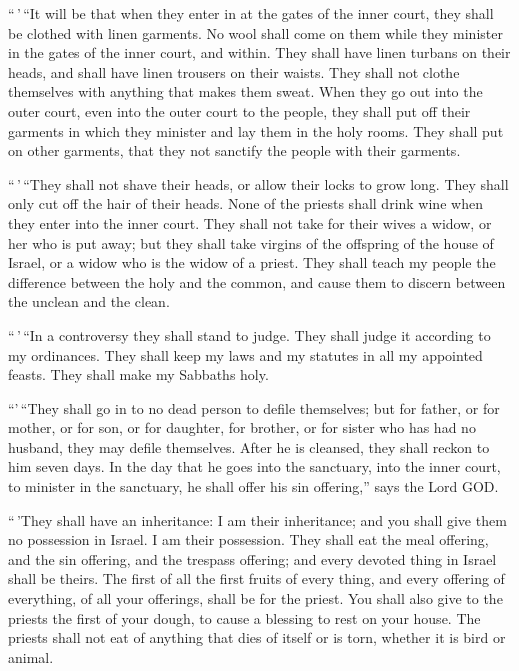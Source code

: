  ``\,'\,``It will be that when they enter in at the gates
of the inner court, they shall be clothed with linen garments. No wool
shall come on them while they minister in the gates of the inner court,
and within.  They shall have linen turbans on their heads,
and shall have linen trousers on their waists. They shall not clothe
themselves with anything that makes them sweat.  When they
go out into the outer court, even into the outer court to the people,
they shall put off their garments in which they minister and lay them in
the holy rooms. They shall put on other garments, that they not sanctify
the people with their garments.

 ``\,'\,``They shall not shave their heads, or allow their
locks to grow long. They shall only cut off the hair of their heads.
 None of the priests shall drink wine when they enter into
the inner court.  They shall not take for their wives a
widow, or her who is put away; but they shall take virgins of the
offspring of the house of Israel, or a widow who is the widow of a
priest.  They shall teach my people the difference between
the holy and the common, and cause them to discern between the unclean
and the clean.

 ``\,'\,``In a controversy they shall stand to judge. They
shall judge it according to my ordinances. They shall keep my laws and
my statutes in all my appointed feasts. They shall make my Sabbaths
holy.

 ``'\,``They shall go in to no dead person to defile
themselves; but for father, or for mother, or for son, or for daughter,
for brother, or for sister who has had no husband, they may defile
themselves.  After he is cleansed, they shall reckon to him
seven days.  In the day that he goes into the sanctuary,
into the inner court, to minister in the sanctuary, he shall offer his
sin offering,'' says the Lord GOD.

 ``\,'They shall have an inheritance: I am their
inheritance; and you shall give them no possession in Israel. I am their
possession.  They shall eat the meal offering, and the sin
offering, and the trespass offering; and every devoted thing in Israel
shall be theirs.  The first of all the first fruits of
every thing, and every offering of everything, of all your offerings,
shall be for the priest. You shall also give to the priests the first of
your dough, to cause a blessing to rest on your house.  The
priests shall not eat of anything that dies of itself or is torn,
whether it is bird or animal.

